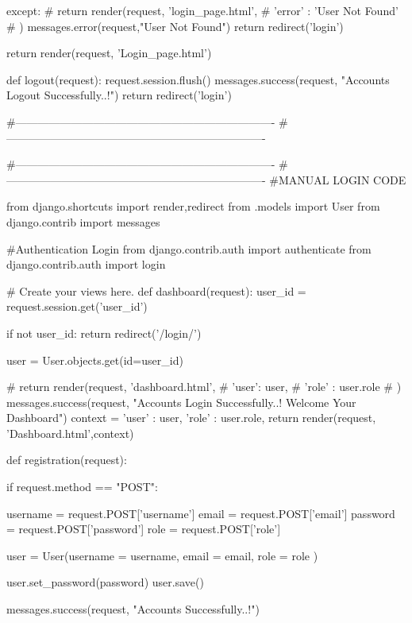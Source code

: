         except:
            # return render(request, 'login_page.html', {
            #     'error' :  'User Not Found'
            # })
            messages.error(request,"User Not Found")
            return redirect('login')
        
    
    return render(request, 'Login_page.html')

def logout(request):
    request.session.flush()
    messages.success(request, "Accounts Logout Successfully..!")
    return redirect('login')

#----------------------------------------------------------------------
#----------------------------------------------------------------------



#----------------------------------------------------------------------
#----------------------------------------------------------------------
#MANUAL LOGIN CODE

from django.shortcuts import render,redirect
from .models import User
from django.contrib import messages

#Authentication Login
from django.contrib.auth import authenticate
from django.contrib.auth import login


# Create your views here.
def dashboard(request):
    user_id = request.session.get('user_id')

    if not user_id:
        return redirect('/login/')

    user = User.objects.get(id=user_id)

    # return render(request, 'dashboard.html', {
    #     'user': user,
    #     'role' : user.role
    # })
    messages.success(request, "Accounts Login Successfully..! Welcome Your Dashboard")
    context = {
        'user' : user,
        'role' : user.role,
    }
    return render(request, 'Dashboard.html',context)


def registration(request):
    
    if request.method == "POST":
    
        username = request.POST['username']
        email = request.POST['email']
        password = request.POST['password']
        role = request.POST['role']

        user = User(username = username, 
                    email = email, 
                    role = role
                    )
         
        user.set_password(password)
        user.save()

        messages.success(request, "Accounts Successfully..!")

